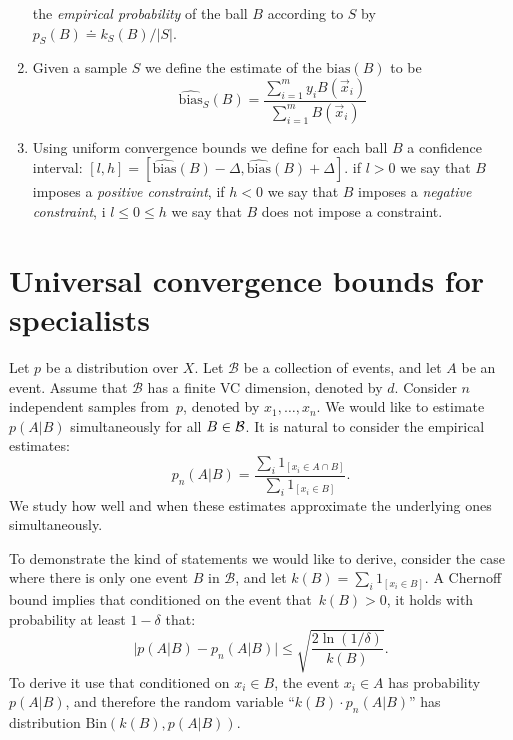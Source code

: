 \documentclass{article}
\newcommand{\B}{{\cal B}}
\newcommand{\x}{\vec{x}}
\newcommand{\cB}{\mathcal{B}}
\newcommand{\bias}{\text{bias}}
\newcommand{\ebias}{\widehat{\text{bias}}}
\newcommand{\samp}{S}
\newcommand{\comment}[3]{\marginpar{\textcolor{#2}{#1: #3}}}
\newcommand{\shay}[1]{\comment{Shay}{red}{#1}}
\newcommand{\yoav}[1]{\comment{Yoav}{blue}{#1}}
\begin{document}
\begin{enumerate}
    the {\em empirical probability} of the ball $B$ according to
    $\samp$ by $p_{\samp}(B) \doteq k_{\samp}(B)/|\samp|$.
  \item Given a sample $\samp$ we define the estimate of the
    $\bias(B)$ to be
    \[
    \ebias_{\samp}(B) = \frac{\sum_{i=1}^m y_i B(\x_i)}{\sum_{i=1}^m B(\x_i)}
    \]
  \item Using uniform convergence bounds we define for each ball $B$
    a confidence interval:
    $[l,h]=[\ebias(B)-\Delta,\ebias(B)+\Delta]$.
    if $l>0$ we say that $B$ imposes a {\em positive constraint}, if
    $h<0$ we say that $B$ imposes a {\em negative constraint}, i
    $l\leq 0 \leq h$ we say that $B$ does not impose a constraint.
\end{enumerate}

\section{Universal convergence bounds for specialists}
\label{sec:convergence-bounds}

\yoav{I think that stating using the general term $A$ is an event,
  rather than the more problem specific $y=+1$ is confusing. I like
  the discussion but I would like to shorten it and not use ``too good
  to be true'' non-theorems.}
 \shay{ I believe this statement can be interesting beyond this context (e.g. it is related to discrepancy). Therefore,  I think it is better if one can read and understand the statement without knowing our definitions of bias, etc\ldots
We can explain how we use it in detail to avoid confusion.
I can remove the ``too good to be true'' part after I am back to Princeton.}



Let $p$ be a distribution over $X$.
Let $\cB$ be a collection of events, and let $A$ be an event.
Assume that $\cB$ has a finite VC dimension, denoted by $d$.
Consider $n$ independent samples from~$p$, denoted by $x_1,\ldots,x_n$.
We would like to estimate $p(A \vert B)$ simultaneously for all $B\in \B$.
It is natural to consider the empirical estimates:
\[p_n(A\vert B)=\frac{\sum_i 1_{[x_i\in A \cap B]}}{\sum_i 1_{[x_i\in B]}}.\]
We study how well and when these estimates approximate the underlying ones simultaneously.

To demonstrate the kind of statements we would like to derive,
consider the case where there is only one event $B$ in $\cB$, 
and let $k(B)=\sum_i 1_{[x_i\in B]}$.
A Chernoff bound implies that conditioned on the event that~$k(B)>0$, 
it holds with probability at least $1-\delta$ that:
\begin{equation}\label{eq:chernoff}
\bigl\lvert p(A\vert B) - p_n(A \vert B) \bigr\rvert \leq \sqrt{\frac{2\ln(1/\delta)}{k(B)}}.
\end{equation}
To derive it use that conditioned on $x_i\in B$, the event $x_i\in A$ has probability $p(A\vert B)$, 
and therefore the random variable ``$k(B)\cdot p_n(A \vert B)$'' has distribution $\mbox{Bin}(k(B), p(A\vert B))$.
\end{document}
